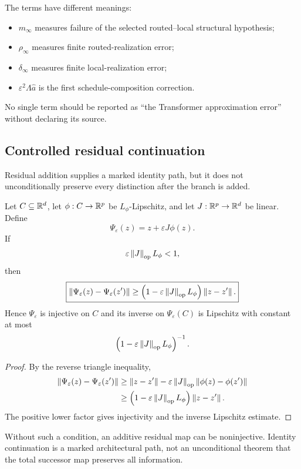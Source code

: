 The terms have different meanings:
\begin{itemize}
\item $m_\infty$ measures failure of the selected routed--local structural hypothesis;
\item $\rho_\infty$ measures finite routed-realization error;
\item $\delta_\infty$ measures finite local-realization error;
\item $\varepsilon^2\Lambda\widehat a$ is the first schedule-composition correction.
\end{itemize}
No single term should be reported as ``the Transformer approximation error'' without declaring its source.

\subsection{Controlled residual continuation}

Residual addition supplies a marked identity path, but it does not unconditionally preserve every distinction after the branch is added.

\begin{lemma}\label{lem:supp-residual-injective}
Let $C\subseteq\mathbb{R}^d$, let $\phi:C\to\mathbb{R}^p$ be $L_\phi$-Lipschitz, and let $J:\mathbb{R}^p\to\mathbb{R}^d$ be linear. Define
\[
\Psi_\varepsilon(z)
=
z+\varepsilon J\phi(z).
\]
If
\[
\varepsilon\left\lVert J\right\rVert_{\mathrm{op}}L_\phi<1,
\]
then
\[
\boxed{
\left\lVert \Psi_\varepsilon(z)-\Psi_\varepsilon(z')\right\rVert
\ge
\left(1-\varepsilon\left\lVert J\right\rVert_{\mathrm{op}}L_\phi\right)
\left\lVert z-z'\right\rVert.
}
\]
Hence $\Psi_\varepsilon$ is injective on $C$ and its inverse on $\Psi_\varepsilon(C)$ is Lipschitz with constant at most
\[
\left(1-\varepsilon\left\lVert J\right\rVert_{\mathrm{op}}L_\phi\right)^{-1}.
\]
\end{lemma}

\begin{proof}
By the reverse triangle inequality,
\[
\begin{aligned}
\left\lVert \Psi_\varepsilon(z)-\Psi_\varepsilon(z')\right\rVert
&\ge
\left\lVert z-z'\right\rVert
-
\varepsilon\left\lVert J\right\rVert_{\mathrm{op}}
\left\lVert \phi(z)-\phi(z')\right\rVert\\
&\ge
\left(1-\varepsilon\left\lVert J\right\rVert_{\mathrm{op}}L_\phi\right)
\left\lVert z-z'\right\rVert.
\end{aligned}
\]
The positive lower factor gives injectivity and the inverse Lipschitz estimate.
\end{proof}

Without such a condition, an additive residual map can be noninjective. Identity continuation is a marked architectural path, not an unconditional theorem that the total successor map preserves all information.

